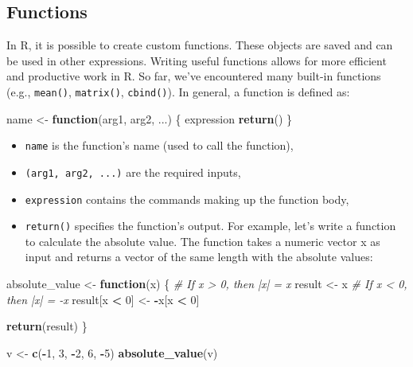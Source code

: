 \documentclass[
]{article}
\newenvironment{Shaded}{\begin{snugshade}}{\end{snugshade}}
\newcommand{\CommentTok}[1]{\textcolor[rgb]{0.56,0.35,0.01}{\textit{#1}}}
\newcommand{\ControlFlowTok}[1]{\textcolor[rgb]{0.13,0.29,0.53}{\textbf{#1}}}
\newcommand{\DecValTok}[1]{\textcolor[rgb]{0.00,0.00,0.81}{#1}}
\newcommand{\FunctionTok}[1]{\textcolor[rgb]{0.13,0.29,0.53}{\textbf{#1}}}
\newcommand{\NormalTok}[1]{#1}
\newcommand{\OtherTok}[1]{\textcolor[rgb]{0.56,0.35,0.01}{#1}}
\newcommand{\SpecialCharTok}[1]{\textcolor[rgb]{0.81,0.36,0.00}{\textbf{#1}}}
\providecommand{\tightlist}{%
  \setlength{\itemsep}{0pt}\setlength{\parskip}{0pt}}
\begin{document}
\hypertarget{functions}{%
\subsection{Functions}\label{functions}}

In R, it is possible to create custom functions. These objects are saved
and can be used in other expressions. Writing useful functions allows
for more efficient and productive work in R. So far, we've encountered
many built-in functions (e.g., \texttt{mean()}, \texttt{matrix()},
\texttt{cbind()}). In general, a function is defined as:

\begin{Shaded}
\begin{Highlighting}[]
\NormalTok{name }\OtherTok{\textless{}{-}} \ControlFlowTok{function}\NormalTok{(arg1, arg2, ...) \{}
\NormalTok{  expression}
  \FunctionTok{return}\NormalTok{()}
\NormalTok{\}}
\end{Highlighting}
\end{Shaded}

\begin{itemize}
\tightlist
\item
  \texttt{name} is the function's name (used to call the function),
\item
  \texttt{(arg1,\ arg2,\ ...)} are the required inputs,
\item
  \texttt{expression} contains the commands making up the function body,
\item
  \texttt{return()} specifies the function's output. For example, let's
  write a function to calculate the absolute value. The function takes a
  numeric vector x as input and returns a vector of the same length with
  the absolute values:
\end{itemize}

\begin{Shaded}
\begin{Highlighting}[]
\NormalTok{absolute\_value }\OtherTok{\textless{}{-}} \ControlFlowTok{function}\NormalTok{(x) \{}
  \CommentTok{\# If x \textgreater{} 0, then |x| = x}
\NormalTok{  result }\OtherTok{\textless{}{-}}\NormalTok{ x}
  \CommentTok{\# If x \textless{} 0, then |x| = {-}x}
\NormalTok{  result[x }\SpecialCharTok{\textless{}} \DecValTok{0}\NormalTok{] }\OtherTok{\textless{}{-}} \SpecialCharTok{{-}}\NormalTok{x[x }\SpecialCharTok{\textless{}} \DecValTok{0}\NormalTok{]}
  
  \FunctionTok{return}\NormalTok{(result)}
\NormalTok{\}}

\NormalTok{v }\OtherTok{\textless{}{-}} \FunctionTok{c}\NormalTok{(}\SpecialCharTok{{-}}\DecValTok{1}\NormalTok{, }\DecValTok{3}\NormalTok{, }\SpecialCharTok{{-}}\DecValTok{2}\NormalTok{, }\DecValTok{6}\NormalTok{, }\SpecialCharTok{{-}}\DecValTok{5}\NormalTok{)}
\FunctionTok{absolute\_value}\NormalTok{(v)}
\end{Highlighting}
\end{Shaded}
\end{document}
